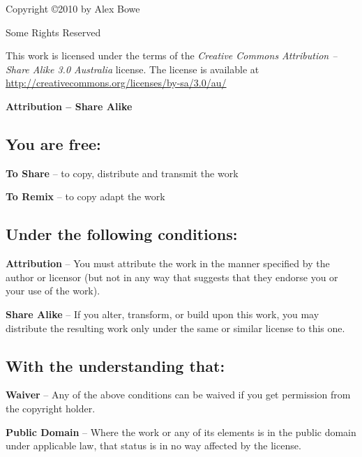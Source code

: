 \begin{center}
  \large{Copyright \copyright 2010 by Alex Bowe

  Some Rights Reserved}
\end{center}

This work is licensed under the terms of the \emph{Creative Commons
  Attribution -- Share Alike 3.0 Australia}
license.  The license is available at
\url{http://creativecommons.org/licenses/by-sa/3.0/au/}

\begin{center}

  \large{\textbf{Attribution -- Share Alike}}
\end{center}

\subsection*{You are free:}

\noindent
\textbf{To Share} -- to copy, distribute and transmit the work

\noindent
\textbf{To Remix} -- to copy adapt the work

\subsection*{Under the following conditions:}

\vspace{1em}
\noindent
\parbox{1.5cm}{}
\parbox{10.5cm}{\textbf{Attribution} -- You must attribute the work in
    the manner specified by the author or licensor (but not in any way
    that suggests that they endorse you or your use of the work).}
      
\vspace{1em}
\noindent
\parbox{1.5cm}{}
\parbox{10.5cm}{\textbf{Share Alike} -- If you alter, transform, or build upon
    this work, you may distribute the resulting work only under the same or
    similar license to this one.}


\subsection*{With the understanding that:}

\noindent
\textbf{Waiver} -- Any of the above conditions can be waived if you
    get permission from the copyright holder.

\vspace{1em}
\noindent
\textbf{Public Domain} -- Where the work or any of its elements is in the public
    domain under applicable law, that status is in no way affected by the
    license.

